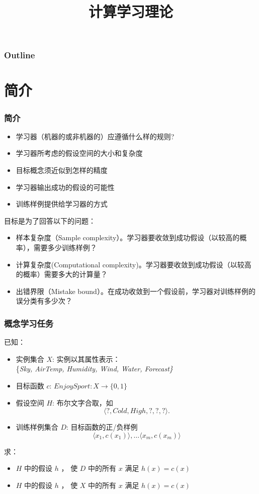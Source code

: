 \documentclass{beamer}
\title{计算学习理论}
\author{}
\date{}
\begin{document}
\maketitle

\begin{frame}
\frametitle{Outline}
\setcounter{tocdepth}{3}
\tableofcontents
\end{frame}









\section{简介}
\label{sec-1}
\begin{frame}
\frametitle{简介}
\label{sec-1-1}

\begin{itemize}
\item 学习器（机器的或非机器的）应遵循什么样的规则?
\item 学习器所考虑的假设空间的大小和复杂度
\item 目标概念须近似到怎样的精度
\item 学习器输出成功的假设的可能性
\item 训练样例提供给学习器的方式
\end{itemize}

目标是为了回答以下的问题：
\begin{itemize}
\item 样本复杂度（Sample complexity）。学习器要收敛到成功假设（以较高的概率），需要多少训练样例？
\item 计算复杂度(Computational complexity)。学习器要收敛到成功假设（以较高的概率）需要多大的计算量？
\item 出错界限（Mistake bound）。在成功收敛到一个假设前，学习器对训练样例的误分类有多少次？
\end{itemize}
\end{frame}
\begin{frame}
\frametitle{概念学习任务}
\label{sec-1-2}

已知：
\begin{itemize}
\item 实例集合 $X$: 实例以其属性表示：\\
\{\em Sky, AirTemp, Humidity, Wind, Water, Forecast\}
\item 目标函数 $c$: $EnjoySport: X \rightarrow \{0,1 \}$
\item 假设空间 $H$: 布尔文字合取，如
    $$\langle ?, Cold, High, ?, ?, ? \rangle.$$
\item 训练样例集合 $D$: 目标函数的正/负样例
    $$\langle x_1, c(x_1) \rangle , \ldots \langle x_m, c(x_m) \rangle$$
\end{itemize}

求：
\begin{itemize}
\item $H$ 中的假设 $h$ ， 使 $D$ 中的所有 $x$ 满足 $h(x)=c(x)$
\item $H$ 中的假设 $h$ ， 使 $X$ 中的所有 $x$ 满足 $h(x)=c(x)$
\end{itemize}
\end{frame}
\end{document}
